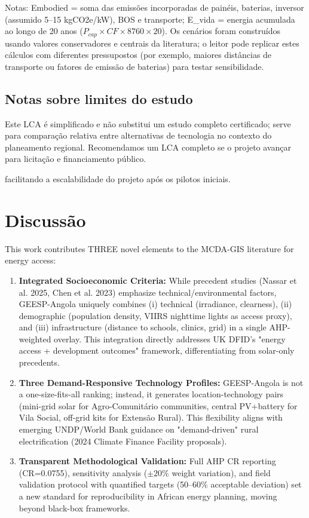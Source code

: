 \documentclass[12pt, a4paper]{article}
\begin{document}
\begin{itemize}
\noindent Notas: Embodied = soma das emissões incorporadas de painéis, baterias, inversor (assumido 5--15 kgCO2e/kW), BOS e transporte; E\_vida = energia acumulada ao longo de 20 anos ($P_{cap}\times CF\times 8760\times 20$). Os cenários foram construídos usando valores conservadores e centrais da literatura; o leitor pode replicar estes cálculos com diferentes pressupostos (por exemplo, maiores distâncias de transporte ou fatores de emissão de baterias) para testar sensibilidade.

\subsection{Notas sobre limites do estudo}
Este LCA é simplificado e não substitui um estudo completo certificado; serve para
comparação relativa entre alternativas de tecnologia no contexto do planeamento regional.
Recomendamos um LCA completo se o projeto avançar para licitação e financiamento público.

facilitando a escalabilidade do projeto após os pilotos iniciais.

\section{Discussão}
This work contributes THREE novel elements to the MCDA-GIS literature for energy access:

\begin{enumerate}
  \item \textbf{Integrated Socioeconomic Criteria:} While precedent studies (Nassar et al. 2025, Chen et al. 2023) emphasize technical/environmental factors, GEESP-Angola uniquely combines (i) technical (irradiance, clearness), (ii) demographic (population density, VIIRS nighttime lights as access proxy), and (iii) infrastructure (distance to schools, clinics, grid) in a single AHP-weighted overlay. This integration directly addresses UK DFID's "energy access + development outcomes" framework, differentiating from solar-only precedents.
  \item \textbf{Three Demand-Responsive Technology Profiles:} GEESP-Angola is not a one-size-fits-all ranking; instead, it generates location-technology pairs (mini-grid solar for Agro-Comunitário communities, central PV+battery for Vila Social, off-grid kits for Extensão Rural). This flexibility aligns with emerging UNDP/World Bank guidance on "demand-driven" rural electrification (2024 Climate Finance Facility proposals).
  \item \textbf{Transparent Methodological Validation:} Full AHP CR reporting (CR=0.0755), sensitivity analysis ($\pm 20\%$ weight variation), and field validation protocol with quantified targets (50--60\% acceptable deviation) set a new standard for reproducibility in African energy planning, moving beyond black-box frameworks.
\end{enumerate}


\end{itemize}
\end{document}
